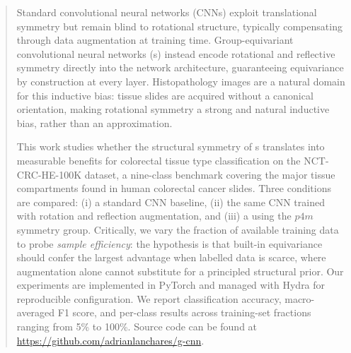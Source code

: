 \begin{abstract}
Standard convolutional neural networks (CNNs) exploit translational symmetry but remain
blind to rotational structure, typically compensating through data augmentation at training
time. Group-equivariant convolutional neural networks (\gcnn{}s) instead encode rotational and
reflective symmetry directly into the network architecture, guaranteeing equivariance by
construction at every layer. Histopathology images are a natural domain for this inductive bias:
tissue slides are acquired without a canonical orientation, making rotational symmetry a strong 
and natural inductive bias, rather than an approximation.

This work studies whether the structural symmetry of \gcnn{}s translates into measurable
benefits for colorectal tissue type classification on the NCT-CRC-HE-100K dataset, a
nine-class benchmark covering the major tissue compartments found in human colorectal cancer
slides. Three conditions are compared: (i) a standard CNN baseline, (ii) the same CNN trained
with rotation and reflection augmentation, and (iii) a \gcnn{} using the \(p4m\) symmetry group.
Critically, we vary the fraction of available training data to probe \emph{sample efficiency}:
the hypothesis is that built-in equivariance should confer the largest advantage when labelled
data is scarce, where augmentation alone cannot substitute for a principled structural prior.
Our experiments are implemented in PyTorch and managed with Hydra for reproducible
configuration. We report classification accuracy, macro-averaged F1 score, and per-class
results across training-set fractions ranging from 5\% to 100\%.
Source code can be found at \url{https://github.com/adrianlanchares/g-cnn}.
\end{abstract}